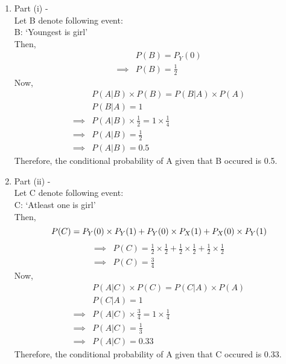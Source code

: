 \documentclass[journal,12pt,twocolumn]{IEEEtran}
\renewcommand\thesection{\arabic{section}}
\begin{document}
    \begin{enumerate}[label=\thesection.\arabic*.,ref=\thesection.\theenumi]
    \item Part (i) - \\
          Let B denote following event: \\
          B: `Youngest is girl' \\
          Then, \\
          \begin{align}
              &P(B) = P_Y(0) \\
              \implies &P(B) = \frac{1}{2}
          \end{align}
          Now, 
          \begin{align}
            &P(A|B)\times P(B) = P(B|A)\times P(A)  \\
            &P(B|A) = 1 \\
            \implies &P(A|B)\times \frac{1}{2} = 1\times \frac{1}{4} \\
            \implies &P(A|B) = \frac{1}{2} \\
            \implies &P(A|B) = 0.5
          \end{align}
        Therefore,  
            the conditional probability of A given that B occured is 0.5. \\
        
    \item Part (ii) - \\
          Let C denote following event: \\
          C: `Atleast one is girl' \\
          Then, \\
          \begin{equation}
            P(C) = P_Y(0)\times P_Y(1) + P_Y(0)\times P_X(1) + P_X(0)\times P_Y(1) \\
        \end{equation}
          \begin{align}
              \implies &P(C) = \frac{1}{2}\times \frac{1}{2} + \frac{1}{2}\times \frac{1}{2} + \frac{1}{2}\times \frac{1}{2} \\
              \implies &P(C) = \frac{3}{4}
          \end{align}
          Now, 
          \begin{align}
            &P(A|C)\times P(C) = P(C|A)\times P(A)  \\
            &P(C|A) = 1 \\ 
            \implies &P(A|C)\times \frac{3}{4} = 1\times \frac{1}{4} \\
            \implies &P(A|C) = \frac{1}{3} \\
            \implies &P(A|C) = 0.33
          \end{align}
        Therefore,  
            the conditional probability of A given that C occured is 0.33. \\
    \end{enumerate}
\end{document}
